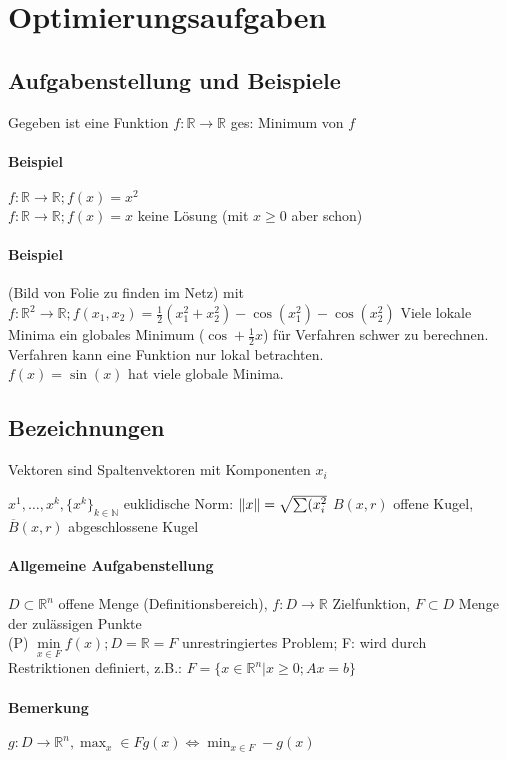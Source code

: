 \documentclass[ngerman,halfparskip]{scrartcl}
\DeclarePairedDelimiter{\norm}{\lVert}{\rVert}
\theoremstyle{definition}
\newcommand*{\R}{\mathbb{R}}      %
\begin{document}
\section{Optimierungsaufgaben}
\subsection{Aufgabenstellung und Beispiele}
Gegeben ist eine Funktion $f\colon \R \rightarrow \R$ ges: Minimum von $f$
\paragraph{Beispiel}
$f\colon\R\rightarrow \R; f(x)=x^2$\\
$f\colon \R\rightarrow \R; f(x)=x$ keine Lösung (mit $x\geq 0$ aber schon)
\paragraph{Beispiel}(Bild von Folie zu finden im Netz) mit  $f\colon\R^2\rightarrow\R; f(x_1,x_2)=\frac 12 (x_1^2+x_2^2)-\cos(x_1^2)-\cos(x_2^2)$ Viele lokale Minima ein globales Minimum ($\cos + \frac 1 2 x$) für Verfahren schwer zu berechnen. Verfahren kann eine Funktion nur lokal betrachten.\\
$f(x)=\sin(x)$ hat viele globale Minima.
\subsection*{Bezeichnungen}
Vektoren sind Spaltenvektoren mit Komponenten $x_i$

$x^1,\ldots,x^k, \{x^{k}\}_{k\in\mathbb{N}}$
euklidische Norm: $\norm{x}=\sqrt{\sum(x_i^2}$
$B(x,r)$ offene Kugel, $\overline B(x,r)$ abgeschlossene Kugel\\

\paragraph*{Allgemeine Aufgabenstellung}
$D\subset\R^n$ offene Menge (Definitionsbereich), $f\colon D\rightarrow\R$ Zielfunktion, $F\subset D$ Menge der zulässigen Punkte\\
(P) $\min\limits_{x\in F} f(x); D=\R=F$ unrestringiertes Problem; F: wird durch Restriktionen definiert, z.B.: $F=\{x\in\R^n | x\geq 0; Ax=b\}$\\
\paragraph*{Bemerkung} $g\colon  D\rightarrow\R^n, \max_x\in F g(x) \Leftrightarrow \min_{x\in F} -g(x)$
\end{document}
